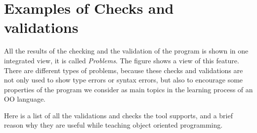 \newpage
\appendix



\section{Examples of Checks and validations}

All the results of the checking and the validation of the program is shown in one integrated view, it is called \emph{Problems}. The figure  shows a view of this feature. 
There are different types of problems, because these checks and validations are not only used to show type errors or syntax errors, but also to encourage some properties of the program we consider as main topics in the learning process of an OO language.

Here is a list of all the validations and checks the tool supports, and a
brief reason why they are useful while teaching object oriented programming.

